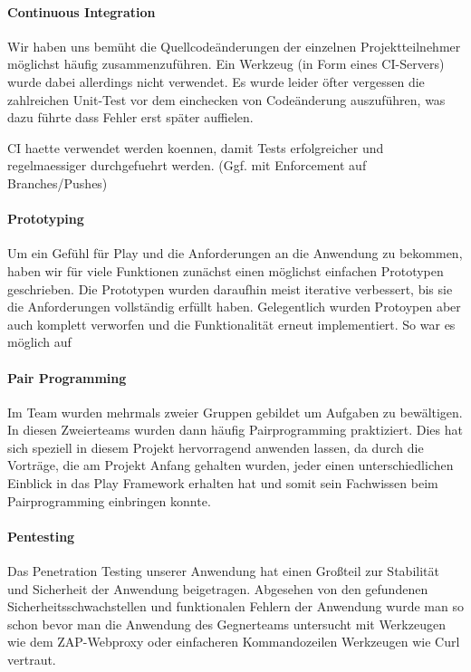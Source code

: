 \documentclass[12pt,DIV14,BCOR10mm,a4paper,parskip=half-,headsepline,headinclude,english,ngerman,bibliography=totocnumbered]{scrreprt}
\begin{document}
\paragraph{Continuous Integration}
Wir haben uns bemüht die Quellcodeänderungen der einzelnen Projektteilnehmer möglichst häufig zusammenzuführen. Ein Werkzeug (in Form eines CI-Servers) wurde dabei allerdings nicht verwendet. Es wurde leider öfter vergessen die zahlreichen Unit-Test vor dem einchecken von Codeänderung auszuführen, was dazu führte dass Fehler erst später auffielen.

 
CI haette verwendet werden koennen, damit Tests erfolgreicher und regelmaessiger durchgefuehrt werden. (Ggf. mit Enforcement auf Branches/Pushes)

\paragraph{Prototyping}
Um ein Gefühl für Play und die Anforderungen an die Anwendung zu bekommen, haben wir für viele Funktionen zunächst einen möglichst einfachen Prototypen geschrieben. Die Prototypen wurden daraufhin meist iterative verbessert, bis sie die Anforderungen vollständig erfüllt haben. Gelegentlich wurden Protoypen aber auch komplett verworfen und die Funktionalität erneut implementiert. So war es möglich auf 


\paragraph{Pair Programming} Im Team wurden mehrmals zweier Gruppen gebildet um Aufgaben zu bewältigen. In diesen Zweierteams wurden dann häufig Pairprogramming praktiziert. Dies hat sich speziell in diesem Projekt hervorragend anwenden lassen, da durch die Vorträge, die am Projekt Anfang gehalten wurden, jeder einen unterschiedlichen Einblick in das Play Framework erhalten hat und somit sein Fachwissen beim Pairprogramming einbringen konnte.


\paragraph{Pentesting} Das Penetration Testing unserer Anwendung hat einen Großteil zur Stabilität und Sicherheit der Anwendung beigetragen. Abgesehen von den gefundenen Sicherheitsschwachstellen und funktionalen Fehlern der Anwendung wurde man so schon bevor man die Anwendung des Gegnerteams untersucht mit Werkzeugen wie dem ZAP-Webproxy oder einfacheren Kommandozeilen Werkzeugen wie Curl vertraut.
\end{document}
